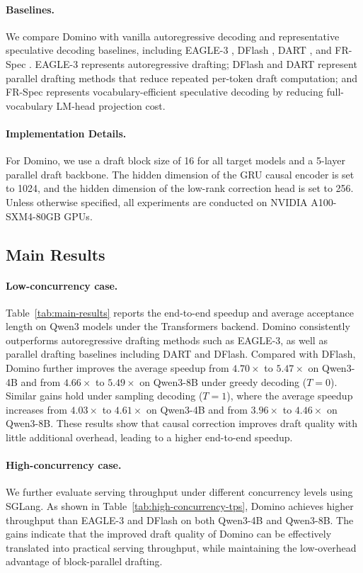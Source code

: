 \paragraph{Baselines.}
We compare Domino with vanilla autoregressive decoding and representative speculative decoding baselines, including EAGLE-3 \citep{li2025eagle3}, DFlash \citep{chen2026dflash}, DART \citep{liu2026dart}, and FR-Spec \citep{zhao2025fr}. EAGLE-3 represents autoregressive drafting; DFlash and DART represent parallel drafting methods that reduce repeated per-token draft computation; and FR-Spec represents vocabulary-efficient speculative decoding by reducing full-vocabulary LM-head projection cost.  

\paragraph{Implementation Details.}
For Domino, we use a draft block size of 16 for all target models and a 5-layer parallel draft backbone. The hidden dimension of the GRU causal encoder is set to 1024, and the hidden dimension of the low-rank correction head is set to 256. Unless otherwise specified, all experiments are conducted on NVIDIA A100-SXM4-80GB GPUs. 

\subsection{Main Results}

\paragraph{Low-concurrency case.}
Table~\ref{tab:main-results} reports the end-to-end speedup and average acceptance length on Qwen3 models under the Transformers backend. Domino consistently outperforms autoregressive drafting methods such as EAGLE-3, as well as parallel drafting baselines including DART and DFlash. Compared with DFlash, Domino further improves the average speedup from \(4.70\times\) to \(5.47\times\) on Qwen3-4B and from \(4.66\times\) to \(5.49\times\) on Qwen3-8B under greedy decoding (\(T=0\)). Similar gains hold under sampling decoding (\(T=1\)), where the average speedup increases from \(4.03\times\) to \(4.61\times\) on Qwen3-4B and from \(3.96\times\) to \(4.46\times\) on Qwen3-8B. These results show that causal correction improves draft quality with little additional overhead, leading to a higher end-to-end speedup.
\paragraph{High-concurrency case.}
We further evaluate serving throughput under different concurrency levels using SGLang. As shown in Table~\ref{tab:high-concurrency-tps}, Domino achieves higher throughput than EAGLE-3 and DFlash on both Qwen3-4B and Qwen3-8B. The gains indicate that the improved draft quality of Domino can be effectively translated into practical serving throughput, while maintaining the low-overhead advantage of block-parallel drafting.


